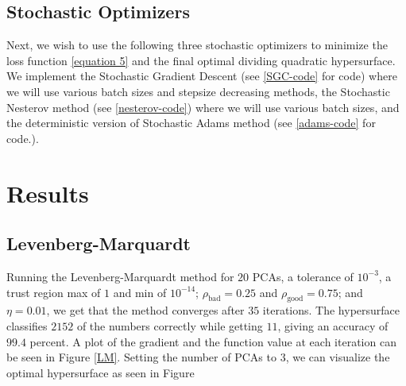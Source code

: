 \documentclass[12pt]{article}%
\begin{document}
\subsection{Stochastic Optimizers}
Next, we wish to use the following three stochastic optimizers to minimize the loss function \ref{equation 5} and the final optimal dividing quadratic hypersurface. We implement the Stochastic Gradient Descent (see \ref{SGC-code} for code) where we will use various batch sizes and stepsize decreasing methods, the Stochastic Nesterov method (see \ref{nesterov-code}) where we will use various batch sizes, and the deterministic version of Stochastic Adams method (see \ref{adams-code} for code.).


\section{Results}
\subsection{Levenberg-Marquardt}
Running the Levenberg-Marquardt method for $20$ PCAs, a tolerance of $10^{-3}$, a trust region max of $1$ and min of $10^{-14}$; $\rho_\text{bad} = 0.25$ and $\rho_\text{good} = 0.75$; and $\eta = 0.01$, we get that the method converges after $35$ iterations. The hypersurface classifies $2152$ of the numbers correctly while getting $11$, giving an accuracy of $99.4$ percent. A plot of the gradient and the function value at each iteration can be seen in Figure \ref{LM}. Setting the number of PCAs to $3$, we can visualize the optimal hypersurface as seen in Figure 
\end{document}
